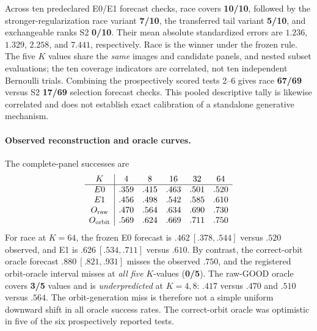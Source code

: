 Across ten predeclared E0/E1 forecast checks, race covers
\textbf{10/10}, followed by the stronger-regularization
race variant \textbf{7/10}, the transferred tail variant
\textbf{5/10}, and exchangeable ranks S2 \textbf{0/10}.
Their mean absolute standardized errors are
$1.236$, $1.329$, $2.258$, and $7.441$, respectively.
Race is the winner under the frozen rule.
The five $K$ values share the \emph{same} images and candidate panels,
and nested subset evaluations; the ten coverage indicators are
correlated, not ten independent Bernoulli trials.
Combining the prospectively scored tests 2--6 gives
race \textbf{67/69} versus S2 \textbf{17/69}
selection forecast checks. This pooled descriptive tally
is likewise correlated and does not establish exact calibration
of a standalone generative mechanism.

\paragraph{Observed reconstruction and oracle curves.}
The complete-panel successes are
\[
\begin{array}{c|ccccc}
K&4&8&16&32&64\\ \hline
E0&.359&.415&.463&.501&.520\\
E1&.456&.498&.542&.585&.610\\
O_{\rm raw}&.470&.564&.634&.690&.730\\
O_{\rm orbit}&.569&.624&.669&.711&.750
\end{array}
\]
For race at $K=64$, the frozen E0 forecast is
$.462\ [ .378,.544]$ versus $.520$ observed,
and E1 is $.626\ [ .534,.711]$ versus $.610$.
By contrast, the correct-orbit oracle forecast
$.880\ [ .821,.931]$ misses the observed $.750$,
and the registered orbit-oracle interval misses at
\emph{all five} $K$-values (\textbf{0/5}).
The raw-GOOD oracle covers \textbf{3/5} values and
is \emph{underpredicted} at $K=4,8$:
$.417$ versus $.470$ and $.510$ versus $.564$.
The orbit-generation miss is therefore not a simple
uniform downward shift in all oracle success rates.
The correct-orbit oracle was optimistic in five
of the six prospectively reported tests.

